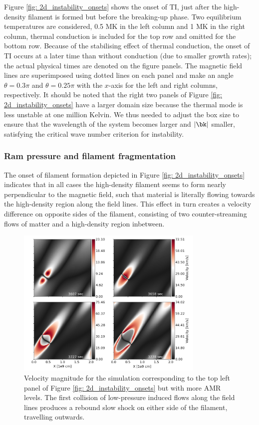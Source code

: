 Figure \ref{fig: 2d_instability_onsets} shows the onset of TI, just after the high-density filament is formed but before the breaking-up phase. Two equilibrium temperatures are considered, 0.5 MK in the left column and 1 MK in the right column, thermal conduction is included for the top row and omitted for the bottom row. Because of the stabilising effect of thermal conduction, the onset of TI occurs at a later time than without conduction (due to smaller growth rates); the actual physical times are denoted on the figure panels. The magnetic field lines are superimposed using dotted lines on each panel and make an angle $\theta = 0.3\pi$ and $\theta = 0.25\pi$ with the $x$-axis for the left and right columns, respectively. It should be noted that the right two panels of Figure \ref{fig: 2d_instability_onsets} have a larger domain size because the thermal mode is less unstable at one million Kelvin. We thus needed to adjust the box size to ensure that the wavelength of the system becomes larger and $|\bk|$ smaller, satisfying the critical wave number criterion for instability.

\subsubsection{Ram pressure and filament fragmentation}
The onset of filament formation depicted in Figure \ref{fig: 2d_instability_onsets} indicates that in all cases the high-density filament seems to form nearly perpendicular to the magnetic field, such that material is literally flowing towards the high-density region along the field lines. This effect in turn creates a velocity difference on opposite sides of the filament, consisting of two counter-streaming flows of matter and a high-density region inbetween.

\begin{figure}[b]
  \centering
  \includegraphics[width=0.8\textwidth]{2d_velocity_plots.png}
  \caption{
    Velocity magnitude for the simulation corresponding to the top left panel of Figure \ref{fig: 2d_instability_onsets} but with more AMR levels. The first collision of low-pressure induced flows along the field lines produces a rebound slow shock on either side of the filament, travelling outwards.
  }
  \label{fig: 2d_velocity_plots}
\end{figure}

